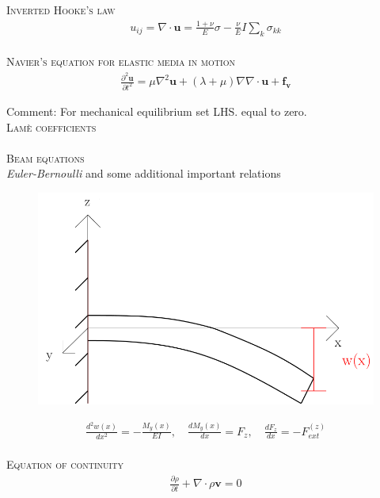 \documentclass[11pt,a4paper,english]{article}
\begin{document}
{\scshape Inverted Hooke's law} \\
\begin{align*}
u_{ij} = \nabla \cdot \mathbf{u} = \frac{1+\nu}{E}\sigma - \frac{\nu}{E}I \sum_k \sigma_{kk}
\end{align*}
\\[2ex]

{\scshape Navier's equation for elastic media in motion} \\
\begin{align*}
\frac{\partial^2 \mathbf{u}}{\partial t^2} = \mu \nabla^2 \mathbf{u} + (\lambda + \mu) \nabla \nabla \cdot \mathbf{u} + \mathbf{f_v}
\end{align*}

Comment: For mechanical equilibrium set LHS. equal to zero. 
\\[2ex]

{\scshape Lamè coefficients} \\
\\[2ex]

{\scshape Beam equations} \\

\emph{Euler-Bernoulli} and some additional important relations

\begin{figure}[h!]
\centering
\includegraphics[scale=0.15]{figures/beam.png}
\end{figure}


\begin{align*}
\frac{d^2 w(x)}{dx^2} = - \frac{M_y (x)}{EI}, \quad \frac{dM_y(x)}{dx} = F_z, \quad \frac{dF_z}{dx} = - F_{ext}^{(z)} 
\end{align*}
\\[2ex]

{\scshape Equation of continuity} \\
\begin{align*}
\frac{\partial \rho}{\partial t} + \nabla \cdot  \rho \mathbf{v} = 0
\end{align*}
\\[2ex]
\end{document}
